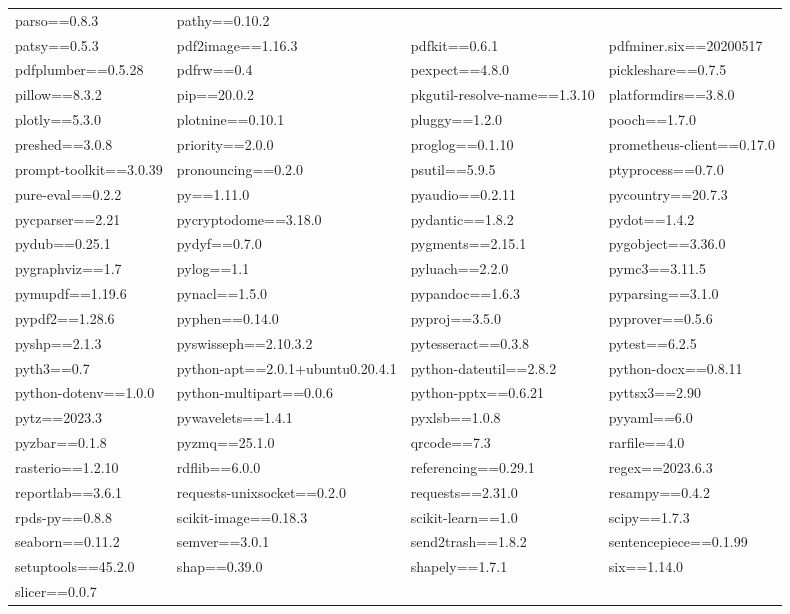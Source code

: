 \begin{tabular}{l l l l}
parso==0.8.3 & pathy==0.10.2 \\ patsy==0.5.3 & pdf2image==1.16.3 & pdfkit==0.6.1 & pdfminer.six==20200517 \\ pdfplumber==0.5.28 & 
pdfrw==0.4 & pexpect==4.8.0 & pickleshare==0.7.5 \\ pillow==8.3.2 & pip==20.0.2 & pkgutil-resolve-name==1.3.10 & platformdirs==3.8.0 \\ 
plotly==5.3.0 & plotnine==0.10.1 & pluggy==1.2.0 & pooch==1.7.0 \\ preshed==3.0.8 & priority==2.0.0 & proglog==0.1.10 & 
prometheus-client==0.17.0 \\ prompt-toolkit==3.0.39 & pronouncing==0.2.0 & psutil==5.9.5 & ptyprocess==0.7.0 \\ pure-eval==0.2.2 & py==1.11.0 & 
pyaudio==0.2.11 & pycountry==20.7.3 \\ pycparser==2.21 & pycryptodome==3.18.0 & pydantic==1.8.2 & pydot==1.4.2 \\ pydub==0.25.1 & 
pydyf==0.7.0 & pygments==2.15.1 & pygobject==3.36.0 \\ pygraphviz==1.7 & pylog==1.1 & pyluach==2.2.0 & pymc3==3.11.5 \\ 
pymupdf==1.19.6 & pynacl==1.5.0 & pypandoc==1.6.3 & pyparsing==3.1.0 \\ pypdf2==1.28.6 & pyphen==0.14.0 & pyproj==3.5.0 & 
pyprover==0.5.6 \\ pyshp==2.1.3 & pyswisseph==2.10.3.2 & pytesseract==0.3.8 & pytest==6.2.5 \\ pyth3==0.7 & python-apt==2.0.1+ubuntu0.20.4.1 & 
python-dateutil==2.8.2 & python-docx==0.8.11 \\ python-dotenv==1.0.0 & python-multipart==0.0.6 & python-pptx==0.6.21 & pyttsx3==2.90 \\ pytz==2023.3 & 
pywavelets==1.4.1 & pyxlsb==1.0.8 & pyyaml==6.0 \\ pyzbar==0.1.8 & pyzmq==25.1.0 & qrcode==7.3 & rarfile==4.0 \\ 
rasterio==1.2.10 & rdflib==6.0.0 & referencing==0.29.1 & regex==2023.6.3 \\ reportlab==3.6.1 & requests-unixsocket==0.2.0 & requests==2.31.0 & 
resampy==0.4.2 \\ rpds-py==0.8.8 & scikit-image==0.18.3 & scikit-learn==1.0 & scipy==1.7.3 \\ seaborn==0.11.2 & semver==3.0.1 & 
send2trash==1.8.2 & sentencepiece==0.1.99 \\ setuptools==45.2.0 & shap==0.39.0 & shapely==1.7.1 & six==1.14.0 \\ slicer==0.0.7 & 

\end{tabular}
